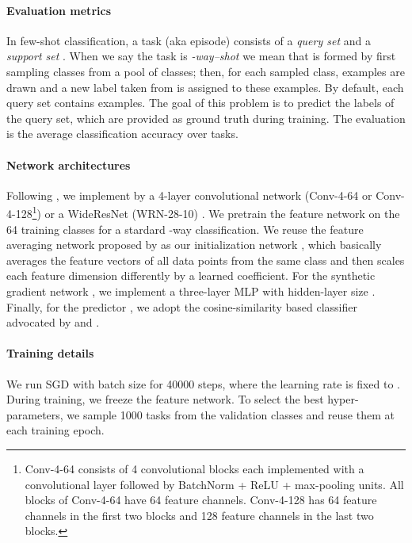 \documentclass{article} \usepackage{iclr2020_conference,times}
\begin{document}
\paragraph{Evaluation metrics} In few-shot classification, 
a task (aka episode)  consists of a \emph{query set}  and a \emph{support set} . 
When we say the task  is \emph{-way--shot} we mean that 
 is formed by first sampling  classes from a pool of classes;
then, for each sampled class,  examples are drawn and a new label taken from  is assigned to these examples.
By default, each query set contains  examples.
The goal of this problem is to predict the labels of the query set, which are provided as ground truth during training.
The evaluation is the average classification accuracy over tasks.


\paragraph{Network architectures}
Following \citet{gidaris2018dynamic,qiao2018few,gidaris2019boosting}, we implement  by a 4-layer convolutional network (Conv-4-64 or Conv-4-128\footnote{
    Conv-4-64 consists of 4 convolutional blocks each implemented with a  convolutional layer followed by BatchNorm + ReLU +  
    max-pooling units. All blocks of Conv-4-64 have 64 feature channels. 
    Conv-4-128 has 64 feature channels in the first two blocks and  128 feature channels in the last two blocks.
})
or a WideResNet (WRN-28-10) \citep{zagoruyko2016wide}. We pretrain the feature network  on the 64 training classes for a stardard -way classification.
We reuse the feature averaging network proposed by \citet{gidaris2018dynamic} as our initialization network , 
which basically averages the feature vectors of all data points from the same class and then scales each feature dimension differently by a learned coefficient.
For the synthetic gradient network , we implement a three-layer MLP with hidden-layer size .
Finally, for the predictor , we adopt the cosine-similarity based classifier advocated by \citet{chen2019closer} and \citet{gidaris2018dynamic}.


\paragraph{Training details}
We run SGD with batch size  for 40000 steps, where the learning rate is fixed to . During training, we freeze the feature network.
To select the best hyper-parameters, we sample 1000 tasks from the validation classes and reuse them at each training epoch. 
\end{document}
